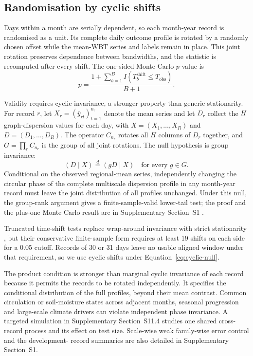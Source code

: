 \documentclass[namedate,webpdf,modern,mediumone]{oup-authoring-template}
\begin{document}
\subsection{Randomisation by cyclic shifts}

Days within a month are serially dependent, so each month-year record is
randomised as a unit. Its complete daily outcome profile is rotated by a
randomly chosen offset while the mean-WBT series and labels remain in place. This
joint rotation preserves dependence between bandwidths, and the statistic is
recomputed after every shift. The one-sided Monte Carlo $p$-value is
\begin{equation}
  p=\frac{1+\sum_{b=1}^{B}
  I(T_b^{\mathrm{shift}}\le T_{\mathrm{obs}})}{B+1}.
  \label{eq:mc-p}
\end{equation}

Validity requires cyclic invariance, a stronger property than generic
stationarity. For record $r$,
let $X_r=(\bar y_{rt})_{t=1}^{n_r}$ denote the mean series and let $D_r$
collect the $H$ graph-dispersion values for each day, with
$X=(X_1,\ldots,X_R)$ and $D=(D_1,\ldots,D_R)$. The operator $C_{n_r}$ rotates
all $H$ columns of $D_r$ together, and $G=\prod_r C_{n_r}$ is the group of
all joint rotations. The null hypothesis is group invariance:
\begin{equation}
  (D\mid X)\overset{d}{=}(gD\mid X)\quad\text{for every }g\in G.
  \label{eq:cyclic-null}
\end{equation}
Conditional on the observed regional-mean series,
independently changing the circular phase of the complete multiscale
dispersion profile in any month-year record must leave the joint distribution
of all profiles unchanged. Under this null, the group-rank argument gives a
finite-sample-valid lower-tail test; the proof and the plus-one Monte Carlo
result are in Supplementary Section~S1 \citep{phipson2010}.

Truncated time-shift tests replace wrap-around invariance with strict
stationarity \citep{harris2020,yuan2024}, but their conservative finite-sample
form requires at least 19 shifts on each side for a 0.05 cutoff. Records of 30
or 31 days leave no usable aligned window under that requirement, so we use
cyclic shifts under Equation~\eqref{eq:cyclic-null}.

The product condition is stronger than marginal cyclic invariance of each
record because it permits the records to be rotated independently. It specifies the
conditional distribution of the full profiles, beyond their mean contrast. Common circulation
or soil-moisture states across adjacent months, seasonal progression and
large-scale climate drivers can violate independent phase invariance. A
targeted simulation in Supplementary Section~S11.4 studies one shared
cross-record process and its effect on test size. Scale-wise weak family-wise error control and the development-
record summaries are also detailed in Supplementary Section~S1.
\end{document}
